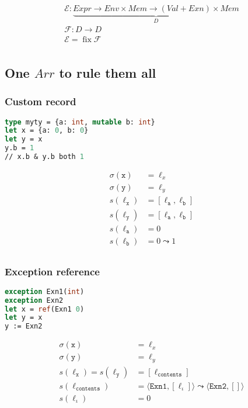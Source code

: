 \documentclass[a4paper]{article}
\newcommand*{\Memory}{\mathit{Mem}}
\newcommand*{\Value}{\mathit{Val}}
\newcommand*{\Env}{\mathit{Env}}
\newcommand*{\Exn}{\mathit{Exn}}
\newcommand*{\Arr}{\mathit{Arr}}
\newcommand*{\Expr}{\mathit{Expr}}
\begin{document}
\begin{gather*}
\mathcal{E} \colon \underbrace{\Expr \to \Env \times \Memory \to (\Value + \Exn) \times \Memory}_D\\
\mathcal{F} \colon D \to D \\
\mathcal{E} = \operatorname{fix} \mathcal{F}\\
\end{gather*}

\subsection{One $\Arr$ to rule them all}
\subsubsection{Custom record}
\begin{minipage}[t]{0.5\textwidth}
\begin{lstlisting}[language=Caml]
type myty = {a: int, mutable b: int}
let x = {a: 0, b: 0}
let y = x
y.b = 1
// x.b & y.b both 1
\end{lstlisting}
\end{minipage}%
\begin{minipage}[t]{0.5\textwidth}
\begin{align*}
  \sigma(\mathtt{x}) &= \ell_x\\
  \sigma(\mathtt{y}) &= \ell_y\\
  s(\ell_{\mathtt{x}}) &= [\ell_{\texttt{a}}, \ell_{\texttt{b}}]\\
  s(\ell_{\mathtt{y}}) &= [\ell_{\texttt{a}}, \ell_{\texttt{b}}]\\
  s(\ell_{\mathtt{a}}) &= 0\\
  s(\ell_{\mathtt{b}}) &= 0 \leadsto 1\\
\end{align*}
\end{minipage}

\subsubsection{Exception reference}
\begin{center}
\begin{minipage}[t]{0.5\textwidth}%
\begin{lstlisting}[language=Caml]
exception Exn1(int)
exception Exn2
let x = ref(Exn1 0)
let y = x
y := Exn2
\end{lstlisting}%
\end{minipage}%
\begin{minipage}[t]{0.5\textwidth}
\begin{align*}
  \sigma(\mathtt{x}) &= \ell_x\\
  \sigma(\mathtt{y}) &= \ell_y\\
  s(\ell_{\mathtt{x}}) = s(\ell_{\mathtt{y}}) &= [\ell_{\mathtt{contents}}]\\
  s(\ell_{\mathtt{contents}}) &= \langle\texttt{Exn1}, [\ell_\iota]\rangle \leadsto \langle\texttt{Exn2}, []\rangle\\
  s(\ell_\iota) &= 0\\
\end{align*}
\end{minipage}
\end{center}
\end{document}
